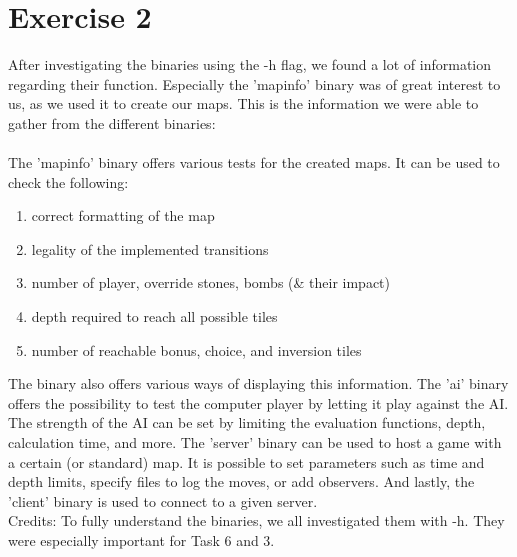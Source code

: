 \section{Exercise 2}
After investigating the binaries using the -h flag, we found a lot of information regarding their function. Especially the 'mapinfo' binary was of great interest to us, as we used it to create our maps.
This is the information we were able to gather from the different binaries:\\ \\
The 'mapinfo' binary offers various tests for the created maps. It can be used to check the following:
\begin{enumerate}
    \item correct formatting of the map
    \item legality of the implemented transitions
    \item number of player, override stones, bombs (\& their impact)
    \item depth required to reach all possible tiles
    \item number of reachable bonus, choice, and inversion tiles
\end{enumerate}
The binary also offers various ways of displaying this information.
The 'ai' binary offers the possibility to test the computer player by letting it play against the AI. The strength of the AI can be set by limiting the evaluation functions, depth, calculation time, and more.
The 'server' binary can be used to host a game with a certain (or standard) map. It is possible to set parameters such as time and depth limits, specify files to log the moves, or add observers.
And lastly, the 'client' binary is used to connect to a given server.\\
Credits: To fully understand the binaries, we all investigated them with -h. They were especially important for Task 6 and 3.